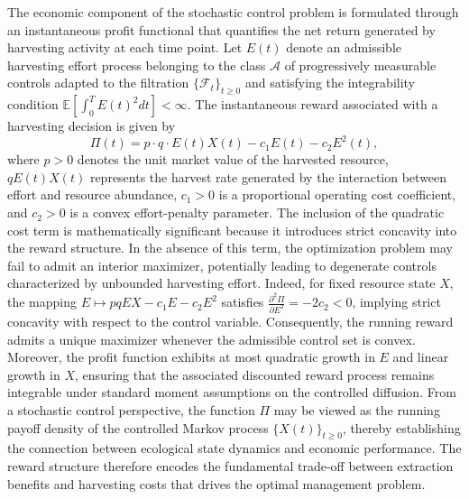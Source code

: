 \documentclass[11pt]{article}
\begin{document}
	The economic component of the stochastic control problem is formulated through an instantaneous profit functional that quantifies the net return generated by harvesting activity at each time point. Let $E(t)$ denote an admissible harvesting effort process belonging to the class $\mathcal{A}$ of progressively measurable controls adapted to the filtration $\{\mathcal{F}_t\}_{t\geq 0}$ and satisfying the integrability condition $\mathbb{E}\left[\int_0^T E(t)^2dt\right]<\infty$. The instantaneous reward associated with a harvesting decision is given by
	\begin{equation}
		\Pi(t)=p\cdot q\cdot E(t)X(t)-c_1E(t)-c_2E^2(t),
		\label{eq:profit}
	\end{equation}
	where $p>0$ denotes the unit market value of the harvested resource, $qE(t)X(t)$ represents the harvest rate generated by the interaction between effort and resource abundance, $c_1>0$ is a proportional operating cost coefficient, and $c_2>0$ is a convex effort-penalty parameter. The inclusion of the quadratic cost term is mathematically significant because it introduces strict concavity into the reward structure. In the absence of this term, the optimization problem may fail to admit an interior maximizer, potentially leading to degenerate controls characterized by unbounded harvesting effort. Indeed, for fixed resource state $X$, the mapping $E\mapsto pqEX-c_1E-c_2E^2$ satisfies $\frac{\partial^2 \Pi}{\partial E^2}=-2c_2<0$, implying strict concavity with respect to the control variable. Consequently, the running reward admits a unique maximizer whenever the admissible control set is convex. Moreover, the profit function exhibits at most quadratic growth in $E$ and linear growth in $X$, ensuring that the associated discounted reward process remains integrable under standard moment assumptions on the controlled diffusion. From a stochastic control perspective, the function $\Pi$ may be viewed as the running payoff density of the controlled Markov process $\{X(t)\}_{t\geq0}$, thereby establishing the connection between ecological state dynamics and economic performance. The reward structure therefore encodes the fundamental trade-off between extraction benefits and harvesting costs that drives the optimal management problem.
	
\end{document}
